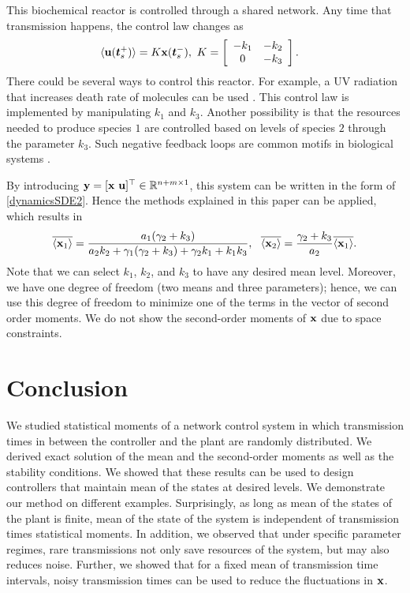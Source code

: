 \documentclass[letterpaper, 10 pt,one column, conference]{ieeeconf}  %
\begin{document}
This biochemical reactor is controlled through a shared network. Any time that transmission happens, the control law changes as
\begin{equation}
\begin{aligned}
&\langle \bold{u} (\boldsymbol{t}_s^+)\rangle=  K \bold{x}(\boldsymbol{t}_s^-),\ K=  \left[\begin{array}{cc}
-k_1 &-k_2\\ 0&-k_3 
\end{array}\right] .
\end{aligned}
\end{equation}
There could be several ways to control this reactor. For example, a UV radiation that increases death rate of molecules can be used \cite{kka04, moh15c}. This control law is implemented by manipulating $k_1$ and $k_3$. Another possibility is that the resources needed to produce species $1$ are controlled based on levels of species $2$ through the parameter $k_3$. Such negative feedback loops are common motifs in biological systems \cite{bps16,sin11, svn14}. 



By introducing $\bold y= [\bold x \ \bold u]^\top\in \mathbb{R}^{n+m\times 1}$, this system can be written in the form of \eqref{dynamicsSDE2}. Hence the methods explained in this paper can be applied, which results in 
	\begin{align}
\overline{\langle \bold x_1 \rangle} =\frac{a_1  (\gamma_2+k_3 )}{a_2  k_2 +\gamma_1  (\gamma_2+k_3 )+\gamma_2 k_1 +k_1 k_3 } ,  \ \  \overline{\langle \bold x_2 \rangle} =\frac{\gamma_2 +k_3 }{a_2 } \overline{\langle \bold x_1 \rangle} .\label{mean0}
\end{align}
Note that we can select $k_1$, $k_2$, and $k_3$ to have any desired mean level. Moreover, we have one degree of freedom (two means and three parameters); hence, we can use this degree of freedom to minimize one of the terms in the vector of second order moments. 
We do not show the second-order moments of $\bold x $ due to space constraints.




\section{Conclusion}

We studied statistical moments of a network control system in which transmission times in between the controller and the plant are randomly distributed. We derived exact solution of the mean and the second-order moments as well as the stability conditions. We showed that these results can be used to design controllers that maintain mean of the states at desired levels. 
We demonstrate our method on different examples. Surprisingly, as long as mean of the states of the plant is finite, mean of the state of the system is independent of transmission times statistical moments. In addition, we observed that under specific parameter regimes, rare transmissions not only save resources of the system, but may also reduces noise. Further, we showed that for a fixed mean of transmission time intervals, noisy transmission times can be used to reduce the fluctuations in $\bold x$. 
\end{document}
